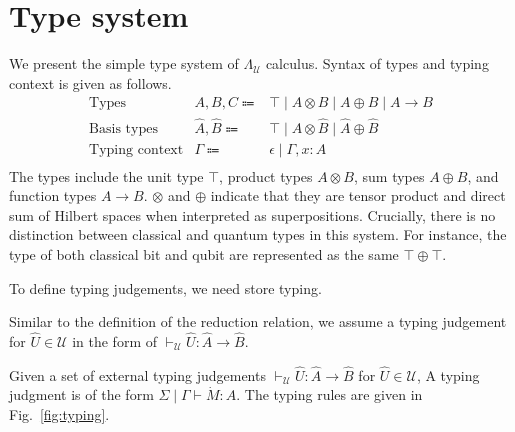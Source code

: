 \section{Type system} \label{sec:type-system}
We present the simple type system of $\Lambda_\mathcal{U}$ calculus.
Syntax of types and typing context is given as follows.
\begin{equation*}
  \begin{array}{lrl}
    \text{Types}          & A, B, C \Coloneqq          & \top\mid A\otimes B\mid A\oplus B\mid A\rightarrow B    \\
    \text{Basis types}    & \hat{A}, \hat{B} \Coloneqq & \top\mid\hat{A}\otimes \hat{B}\mid\hat{A}\oplus \hat{B} \\
    \text{Typing context} & \Gamma \Coloneqq           & \epsilon \mid \Gamma,x:A                                \\
  \end{array}
\end{equation*}
The types include the unit type $\top$, product types $A \otimes B$, sum types $A \oplus B$, and function types $A \rightarrow B$.
$\otimes$ and $\oplus$ indicate that they are tensor product and direct sum of Hilbert spaces when interpreted as superpositions.
Crucially, there is no distinction between classical and quantum types in this system.
For instance, the type of both classical bit and qubit are represented as the same $\top \oplus \top$.

To define typing judgements, we need store typing.

Similar to the definition of the reduction relation, we assume a typing judgement for $\hat{U}\in\mathcal{U}$ in the form of $\vdash_\mathcal{U} \hat{U} : \hat{A} \rightarrow \hat{B}$.
\begin{dfn}
  Given a set of external typing judgements $\vdash_\mathcal{U} \hat{U} : \hat{A} \rightarrow \hat{B}$ for $\hat{U}\in\mathcal{U}$,
  A typing judgment is of the form $\Sigma \mid \Gamma \vdash \dot{M} : A$.
  The typing rules are given in Fig.~\ref{fig:typing}.
\end{dfn}

